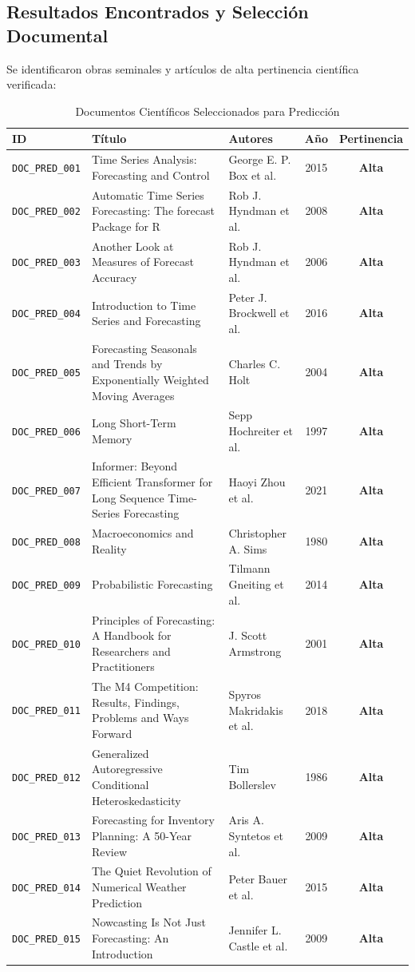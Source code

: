 \subsection{Resultados Encontrados y Selección Documental}
Se identificaron obras seminales y artículos de alta pertinencia científica verificada:
\begin{table}[H]
\centering
\scriptsize
\caption{Documentos Científicos Seleccionados para Predicción}
\begin{tabular}{p{1.8cm}p{4.5cm}p{3.2cm}cc}
\toprule
\textbf{ID} & \textbf{Título} & \textbf{Autores} & \textbf{Año} & \textbf{Pertinencia} \\
\midrule
\texttt{DOC_PRED_001} & Time Series Analysis: Forecasting and Control & George E. P. Box et al. & 2015 & \textbf{Alta} \\
\texttt{DOC_PRED_002} & Automatic Time Series Forecasting: The forecast Package for R & Rob J. Hyndman et al. & 2008 & \textbf{Alta} \\
\texttt{DOC_PRED_003} & Another Look at Measures of Forecast Accuracy & Rob J. Hyndman et al. & 2006 & \textbf{Alta} \\
\texttt{DOC_PRED_004} & Introduction to Time Series and Forecasting & Peter J. Brockwell et al. & 2016 & \textbf{Alta} \\
\texttt{DOC_PRED_005} & Forecasting Seasonals and Trends by Exponentially Weighted Moving Averages & Charles C. Holt & 2004 & \textbf{Alta} \\
\texttt{DOC_PRED_006} & Long Short-Term Memory & Sepp Hochreiter et al. & 1997 & \textbf{Alta} \\
\texttt{DOC_PRED_007} & Informer: Beyond Efficient Transformer for Long Sequence Time-Series Forecasting & Haoyi Zhou et al. & 2021 & \textbf{Alta} \\
\texttt{DOC_PRED_008} & Macroeconomics and Reality & Christopher A. Sims & 1980 & \textbf{Alta} \\
\texttt{DOC_PRED_009} & Probabilistic Forecasting & Tilmann Gneiting et al. & 2014 & \textbf{Alta} \\
\texttt{DOC_PRED_010} & Principles of Forecasting: A Handbook for Researchers and Practitioners & J. Scott Armstrong & 2001 & \textbf{Alta} \\
\texttt{DOC_PRED_011} & The M4 Competition: Results, Findings, Problems and Ways Forward & Spyros Makridakis et al. & 2018 & \textbf{Alta} \\
\texttt{DOC_PRED_012} & Generalized Autoregressive Conditional Heteroskedasticity & Tim Bollerslev & 1986 & \textbf{Alta} \\
\texttt{DOC_PRED_013} & Forecasting for Inventory Planning: A 50-Year Review & Aris A. Syntetos et al. & 2009 & \textbf{Alta} \\
\texttt{DOC_PRED_014} & The Quiet Revolution of Numerical Weather Prediction & Peter Bauer et al. & 2015 & \textbf{Alta} \\
\texttt{DOC_PRED_015} & Nowcasting Is Not Just Forecasting: An Introduction & Jennifer L. Castle et al. & 2009 & \textbf{Alta} \\
\bottomrule
\end{tabular}
\end{table}


